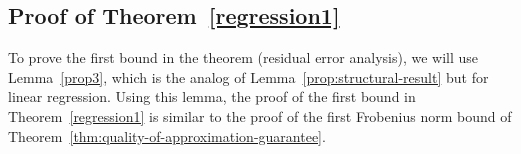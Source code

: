 
\subsection{Proof of Theorem~\ref{regression1}}\label{sec:guarantees3}

To prove the first bound in the theorem (residual error analysis), we will use Lemma~\ref{prop3}, which is the analog of Lemma~\ref{prop:structural-result} but for linear regression.
Using this lemma, the proof of the first bound in Theorem~\ref{regression1} is similar to the proof of the first Frobenius norm bound
of Theorem~\ref{thm:quality-of-approximation-guarantee}.


